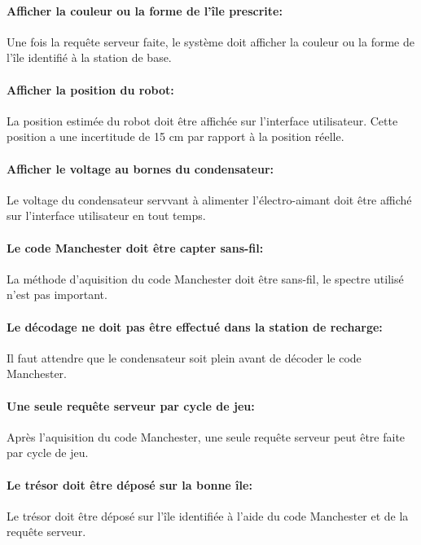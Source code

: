 \paragraph{Afficher la couleur ou la forme de l'île prescrite:} Une fois la requête serveur faite, le système doit afficher la couleur ou la forme de l'île identifié à la station de base.

\paragraph{Afficher la position du robot:}
La position estimée du robot doit être affichée sur l'interface utilisateur. Cette position a une incertitude de 15 cm par rapport à la position réelle.

\paragraph{Afficher le voltage au bornes du condensateur:}
Le voltage du condensateur servvant à alimenter l'électro-aimant doit être affiché sur l'interface utilisateur en tout temps.

\paragraph{Le code Manchester doit être capter sans-fil:}
La méthode d'aquisition du code Manchester doit être sans-fil, le spectre utilisé n'est pas important.

\paragraph{Le décodage ne doit pas être effectué dans la station de recharge:}

Il faut attendre que le condensateur soit plein avant de décoder le code Manchester.

\paragraph{Une seule requête serveur par cycle de jeu:}
Après l'aquisition du code Manchester, une seule requête serveur peut être faite par cycle de jeu.

\paragraph{Le trésor doit être déposé sur la bonne île:}
Le trésor doit être déposé sur l'île identifiée à l'aide du code Manchester et de la requête serveur.

